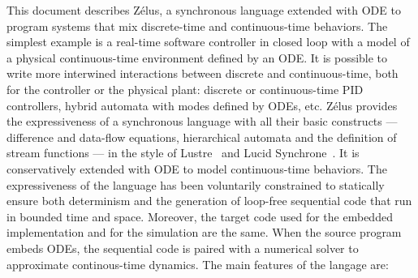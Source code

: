 \documentclass[11pt,titlepage,twoside]{report}
\newcommand{\zelus}{{\sf Z\'elus}}
\newcommand{\lustre}{{\sf Lustre}}
\newcommand{\lucy}{{\sf Lucid Synchrone}}
\begin{document}
This document describes \zelus, a synchronous language extended with
\ac{ODE} to program systems that mix discrete-time and continuous-time
behaviors.  The simplest example is a real-time software controller in
closed loop with a model of a physical continuous-time environment
defined by an \ac{ODE}. It is possible to write more interwined
interactions between discrete and continuous-time, both for the controller or
the physical plant: discrete or continuous-time PID controllers,
hybrid automata with modes defined by \acp{ODE}, etc.
\zelus{} provides the expressiveness of a synchronous language with
all their basic constructs --- difference and data-flow equations,
hierarchical automata and the definition of stream functions --- in
the style of \lustre~\cite{lustre:ieee91} and
\lucy~\cite{lucy:iste07}. It is conservatively extended with \ac{ODE}
to model continuous-time behaviors. The expressiveness of the language
has been voluntarily constrained to statically ensure both
determinism and the generation of loop-free sequential code that
run in bounded time and space. Moreover, the target code used for the
embedded implementation and for the simulation are the same.  When the
source program embeds \acp{ODE}, the sequential code is paired with a
numerical solver to approximate continous-time dynamics.
%
The main features of the langage 
are:
\end{document}
